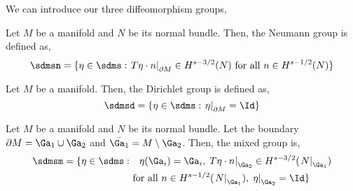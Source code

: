 \noindent
We can introduce our three diffeomorphism groups,
\begin{ndefi}
  Let $M$ be a manifold and $N$ be its normal bundle. Then, the Neumann group is defined as,
  $$ \sdmsn = \{ \eta \in \sdms : \left.T\eta \cdot n\right|_{\partial M} \in H^{s - 3/2}(N) \text{ for all } n \in H^{s - 1/2}(N) \} $$
\end{ndefi}
\begin{ndefi}
  Let $M$ be a manifold. Then, the Dirichlet group is defined as,
  $$ \sdmsd = \{ \eta \in \sdms : \left. \eta \right|_{\partial M} = \Id \} $$
\end{ndefi}
\begin{ndefi}
  Let $M$ be a manifold and $N$ be its normal bundle. Let the boundary $\partial M = \Ga_1 \cup \Ga_2$ and $\bar{\Ga_1} = M \setminus \Ga_2$. Then, the mixed group is,
  \begin{align*}
    \sdmsm = \{ \eta \in \sdms : &\quad\eta (\Ga_i) = \Ga_i,\, \left.T\eta \cdot n\right|_{\Ga_2} \in H^{s - 3/2}(\left. N \right|_{\Ga_1}) \\
    &\text{ for all } n \in H^{s - 1/2}(\left. N \right|_{\Ga_1}),\, \left. \eta \right|_{\Ga_2} = \Id \}
  \end{align*}
\end{ndefi}


